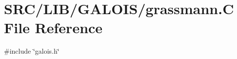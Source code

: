 \hypertarget{_l_i_b_2_g_a_l_o_i_s_2grassmann_8_c}{}\section{S\+R\+C/\+L\+I\+B/\+G\+A\+L\+O\+I\+S/grassmann.C File Reference}
\label{_l_i_b_2_g_a_l_o_i_s_2grassmann_8_c}
{\ttfamily \#include \char`\"{}galois.\+h\char`\"{}}\newline
